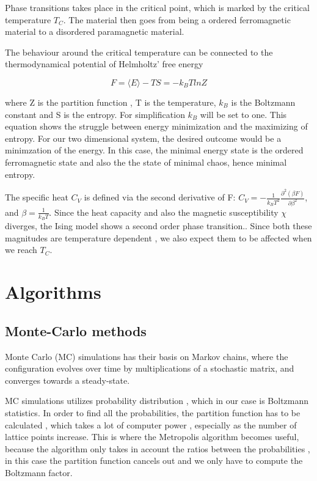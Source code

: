 \documentclass{article}
\begin{document}
Phase transitions takes place  in the critical point, which is marked by the critical temperature $T_C$. The material then goes from being a ordered ferromagnetic material to a disordered paramagnetic material. 

The behaviour around the critical temperature can be connected to the thermodynamical  potential of  Helmholtz' free energy

\begin{equation}
    F = \langle E \rangle - TS = - k_B TlnZ
\end{equation}

where Z is the partition function , T is the temperature, $k_B$ is the Boltzmann constant and S is the entropy. For simplification  $k_B $ will be set to one.  This equation shows the struggle between energy minimization and the maximizing of entropy. For our two dimensional system, the desired outcome would be a minimzation of the energy. In this case, the minimal energy state is the ordered ferromagnetic state and also the the state of minimal chaos, hence minimal entropy.  \newline

The specific heat $C_V$ is defined via the second derivative of F: $C_V = - \frac{1}{k_B T^2}\frac{\partial^2(\beta F)}{\partial \beta ^2}$, and $\beta = \frac{1}{k_B T}$. Since the heat capacity and also the magnetic susceptibility  $\chi$  diverges, the Ising model shows a second order phase transition.. Since both these magnitudes are temperature dependent , we also expect them to be affected when we reach $T_C$. \newline




\section{Algorithms}

\subsection{Monte-Carlo methods }\label{const_mot}
Monte Carlo (MC) simulations has their basis on Markov chains, where the configuration evolves over time by multiplications of a stochastic matrix, and converges towards a steady-state.

MC simulations utilizes probability distribution , which in our case is Boltzmann statistics. In order to find all the probabilities, the partition function has to be calculated , which takes a lot  of computer power , especially as the number of lattice points increase. This is where the Metropolis algorithm becomes useful, because the algorithm only takes in account the ratios between the probabilities , in this case the partition function cancels out and we only have to compute the Boltzmann factor.
\end{document}
